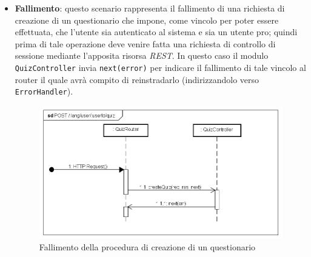 \begin{itemize}
\item \textbf{Fallimento}: questo scenario rappresenta il fallimento di una richiesta di creazione di un questionario che impone, come vincolo per poter essere effettuata, che l'utente sia autenticato al sistema e sia un utente pro; quindi prima di tale operazione deve venire fatta una richiesta di controllo di sessione mediante l'apposita risorsa \textit{REST}. In questo caso il modulo \texttt{QuizController} invia \texttt{next(error)} per indicare il fallimento di tale vincolo al router il quale avrà compito di reinstradarlo (indirizzandolo verso \texttt{ErrorHandler}).
\label{Fallimento della procedura di creazione di un questionario}
\begin{figure}[ht]
	\centering
	\includegraphics[scale=0.55]{UML/DiagrammiDiSequenza/Back-end/POST__lang_user_userId_quiz_failure.png}
	\caption{Fallimento della procedura di creazione di un questionario}
\end{figure}
\FloatBarrier
\end{itemize}

